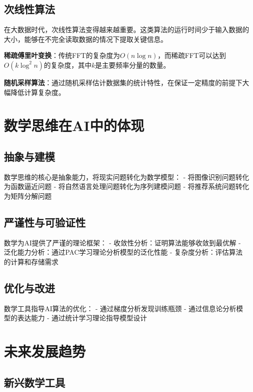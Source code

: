 \subsection{次线性算法}

在大数据时代，次线性算法变得越来越重要。这类算法的运行时间少于输入数据的大小，能够在不完全读取数据的情况下提取关键信息。

\textbf{稀疏傅里叶变换}：传统FFT的复杂度为$O(n \log n)$，而稀疏FFT可以达到$O(k \log^2 n)$的复杂度，其中$k$是主要频率分量的数量。

\textbf{随机采样算法}：通过随机采样估计数据集的统计特性，在保证一定精度的前提下大幅降低计算复杂度。

\section{数学思维在AI中的体现}

\subsection{抽象与建模}

数学思维的核心是抽象能力，将现实问题转化为数学模型：
- 将图像识别问题转化为函数逼近问题
- 将自然语言处理问题转化为序列建模问题
- 将推荐系统问题转化为矩阵分解问题

\subsection{严谨性与可验证性}

数学为AI提供了严谨的理论框架：
- 收敛性分析：证明算法能够收敛到最优解
- 泛化能力分析：通过PAC学习理论分析模型的泛化性能
- 复杂度分析：评估算法的计算和存储需求

\subsection{优化与改进}

数学工具指导AI算法的优化：
- 通过梯度分析发现训练瓶颈
- 通过信息论分析模型的表达能力
- 通过统计学习理论指导模型设计

\section{未来发展趋势}

\subsection{新兴数学工具}


